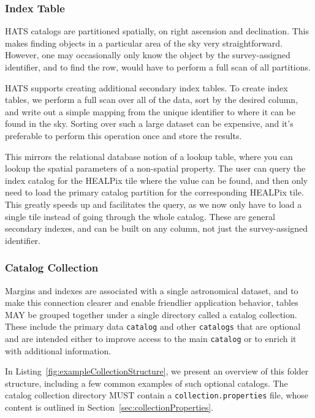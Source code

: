 \documentclass[11pt,a4paper]{ivoa}
\begin{document}
\subsubsection{Index Table} \label{sec:index}

HATS catalogs are partitioned spatially, on right ascension and declination. 
This makes finding objects in a particular area of the sky very straightforward. 
However, one may occasionally only know the object by the survey-assigned identifier, and to find the row, would have to perform a full scan of all partitions. \par

HATS supports creating additional secondary index tables. 
To create index tables, we perform a full scan over all of the data, sort by the desired column, and write out a simple mapping from the unique identifier to where it can be found in the sky.
Sorting over such a large dataset can be expensive, and it's preferable to perform this operation once and store the results. \par

This mirrors the relational database notion of a lookup table, where you can lookup the spatial parameters of a non-spatial property.
The user can query the index catalog for the HEALPix tile where the value can be found, and then only need to load the primary catalog partition for the corresponding HEALPix tile. 
This greatly speeds up and facilitates the query, as we now only have to load a single tile instead of going through the whole catalog.
These are general secondary indexes, and can be built on any column, not just the survey-assigned identifier.

\subsubsection{Catalog Collection} \label{sec:collection}

Margins and indexes are associated with a single astronomical dataset, and to make this connection clearer and enable friendlier application behavior, tables MAY be grouped together under a single directory called a catalog collection.
These include the primary data \texttt{catalog} and other \texttt{catalogs} that are optional and are intended either to improve access to the main \texttt{catalog} or to enrich it with additional information. 

In Listing~\ref{fig:exampleCollectionStructure}, we present an overview of this folder structure, including a few common examples of such optional catalogs.
The catalog collection directory MUST contain a \texttt{collection.properties} file, whose content is outlined in Section~\ref{sec:collectionProperties}.
\end{document}
